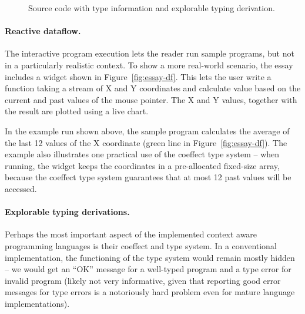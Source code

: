 \begin{figure}[t]
\caption{Source code with type information and explorable typing derivation.}
\label{fig:essay-typing}
\end{figure}


\paragraph{Reactive dataflow.}

The interactive program execution lets the reader run sample programs, but not in a particularly realistic
context. To show a more real-world scenario, the essay includes a widget shown in Figure~\ref{fig:essay-df}.
This lets the user write a function taking a stream of X and Y coordinates and calculate value
based on the current and past values of the mouse pointer. The X and Y values, together with the
result are plotted using a live chart.

In the example run shown above, the sample program calculates the average of the last 12 values
of the X coordinate (green line in Figure~\ref{fig:essay-df}). The example also illustrates one
practical use of the coeffect type system -- when running, the widget keeps the coordinates in a
pre-allocated fixed-size array, because the coeffect type system guarantees that at most 12 past
values will be accessed.

\paragraph{Explorable typing derivations.}

Perhaps the most important aspect of the implemented context aware programming languages is their
coeffect and type system. In a conventional implementation, the functioning of the type system
would remain mostly hidden -- we would get an ``OK'' message for a well-typed program and a type
error for invalid program (likely not very informative, given that reporting good error messages
for type errors is a notoriously hard problem even for mature language implementations).

